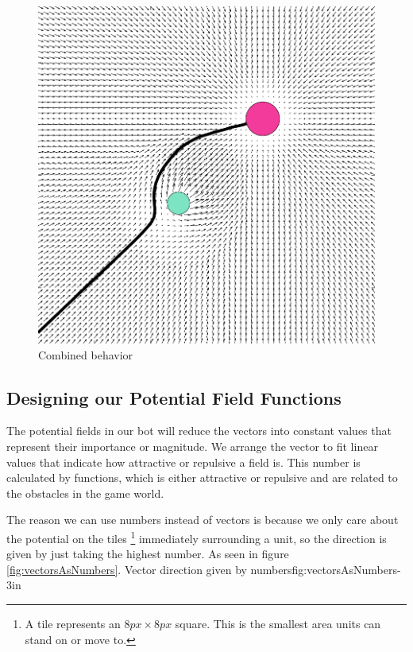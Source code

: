 	\begin{figure}[H]
		\begin{center}
			\includegraphics[scale=0.3]{Figures/Potentialfields/combined.png}
			\caption{Combined behavior\cite{pft}}\label{fig:combinedbehavior}
			\end{center}
	\end{figure}
		
	
	\subsection{Designing our Potential Field Functions}		
		The potential fields in our bot will reduce the vectors into constant values that represent their importance or magnitude. We arrange the vector to fit linear values that indicate how attractive or repulsive a field is. 
		This number is calculated by functions, which is either attractive or repulsive and are related to the obstacles in the game world. 
		
		The reason we can use numbers instead of vectors is because we only care about the potential on the tiles 
		\footnote{A tile represents an $8px \times 8px$ square. 
		This is the smallest area units can stand on or move to.} 
		immediately surrounding a unit, so the direction is given by just taking the highest number. As seen in figure \ref{fig:vectorsAsNumbers}.
		{Vector direction given by numbers}{fig:vectorsAsNumbers}{-3in}
		\\
		\pagebreak
